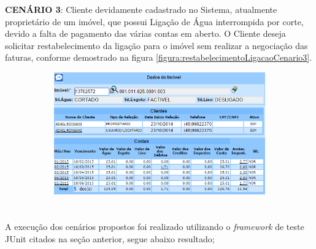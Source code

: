 \begin{flushleft}
	\begin{description}
		\item \textbf{CENÁRIO 3}: Cliente devidamente cadastrado no Sistema, atualmente proprietário de um imóvel, que possui Ligação de Água interrompida por corte, devido a falta de pagamento das várias contas em aberto. O Cliente deseja solicitar restabelecimento da ligação para o imóvel sem realizar a negociação das faturas, conforme demostrado na figura \ref{figura:restabelecimentoLigacaoCenario3}.
		\begin{figure}[H]
			\centering
			\caption{\textbf{Restabelecimento da Ligação de Água - Cenário de Teste 3}}
			\label{figura:restabelecimentoLigacaoCenario3}
			\begin{subfigure}[H]{\textwidth}
				\centering
				\includegraphics{figuras/cenarios/restabelecimento/cenario_3.PNG}
			\end{subfigure}
		\end{figure}
	\end{description}

\end{flushleft}	


\section{\fontsize{12}{1} }


A execução dos cenários propostos foi realizado utilizando o \textit{framework} de teste JUnit citados na seção anterior, segue abaixo resultado; 

\subsection{\fontsize{12}{1} }
 
